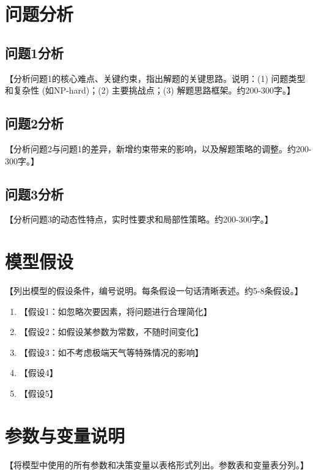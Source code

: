 \documentclass[12pt,letterpaper]{ctexart}
\numberwithin{equation}{section}
\numberwithin{figure}{section}
\numberwithin{table}{section}
\begin{document}
\section{问题分析}

\subsection{问题1分析}
【分析问题1的核心难点、关键约束，指出解题的关键思路。说明：(1) 问题类型和复杂性 (如NP-hard)；(2) 主要挑战点；(3) 解题思路框架。约200-300字。】

\subsection{问题2分析}
【分析问题2与问题1的差异，新增约束带来的影响，以及解题策略的调整。约200-300字。】

\subsection{问题3分析}
【分析问题3的动态性特点，实时性要求和局部性策略。约200-300字。】

\section{模型假设}
【列出模型的假设条件，编号说明。每条假设一句话清晰表述。约5-8条假设。】

\begin{enumerate}[label=\arabic*.]
    \item 【假设1：如忽略次要因素，将问题进行合理简化】
    \item 【假设2：如假设某参数为常数，不随时间变化】
    \item 【假设3：如不考虑极端天气等特殊情况的影响】
    \item 【假设4】
    \item 【假设5】
\end{enumerate}

\section{参数与变量说明}

【将模型中使用的所有参数和决策变量以表格形式列出。参数表和变量表分列。】
\end{document}
